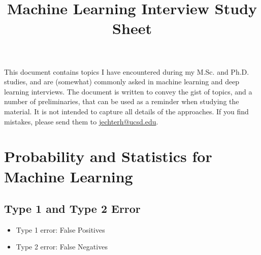 \documentclass[12pt,a4paper]{article}
\title{Machine Learning Interview Study Sheet}
\author{}
\date{}
\begin{document}
\maketitle
This document contains topics I have encountered during my M.Sc. and Ph.D. studies, and are (somewhat) commonly asked in machine learning and deep learning interviews. The document is written to convey the gist of topics, and a number of preliminaries, that can be used as a reminder when studying the material. It is not intended to capture all details of the approaches. If you find mistakes, please send them to \url{jechterh@ucsd.edu}.
\tableofcontents

\pagebreak
\section{Probability and Statistics for Machine Learning}
\subsection{Type 1 and Type 2 Error}
\begin{itemize}
    \item Type 1 error: False Positives
    \item Type 2 error: False Negatives
\end{itemize}
\end{document}
